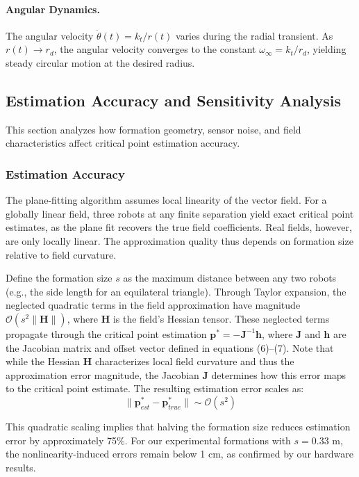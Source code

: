 \documentclass[lettersize,journal]{IEEEtran}
\begin{document}
\paragraph{Angular Dynamics.}
The angular velocity $\dot{\theta}(t) = k_t / r(t)$ varies during the radial transient. As $r(t) \to r_d$, the angular velocity converges to the constant $\omega_\infty = k_t / r_d$, yielding steady circular motion at the desired radius.

\subsection{Estimation Accuracy and Sensitivity Analysis}

This section analyzes how formation geometry, sensor noise, and field characteristics affect critical point estimation accuracy.

\subsubsection{Estimation Accuracy}

The plane-fitting algorithm assumes local linearity of the vector field. For a globally linear field, three robots at any finite separation yield exact critical point estimates, as the plane fit recovers the true field coefficients. Real fields, however, are only locally linear. The approximation quality thus depends on formation size relative to field curvature.

Define the formation size $s$ as the maximum distance between any two robots (e.g., the side length for an equilateral triangle). Through Taylor expansion, the neglected quadratic terms in the field approximation have magnitude $\mathcal{O}(s^2\|\mathbf{H}\|)$, where $\mathbf{H}$ is the field's Hessian tensor. These neglected terms propagate through the critical point estimation $\mathbf{p}^* = -\mathbf{J}^{-1}\mathbf{h}$, where $\mathbf{J}$ and $\mathbf{h}$ are the Jacobian matrix and offset vector defined in equations (6)--(7). Note that while the Hessian $\mathbf{H}$ characterizes local field curvature and thus the approximation error magnitude, the Jacobian $\mathbf{J}$ determines how this error maps to the critical point estimate. The resulting estimation error scales as:
\begin{equation}
\|\mathbf{p}^*_{est} - \mathbf{p}^*_{true}\| \sim \mathcal{O}(s^2)
\end{equation}

This quadratic scaling implies that halving the formation size reduces estimation error by approximately 75\%. For our experimental formations with $s = 0.33$ m, the nonlinearity-induced errors remain below 1 cm, as confirmed by our hardware results.
\end{document}
